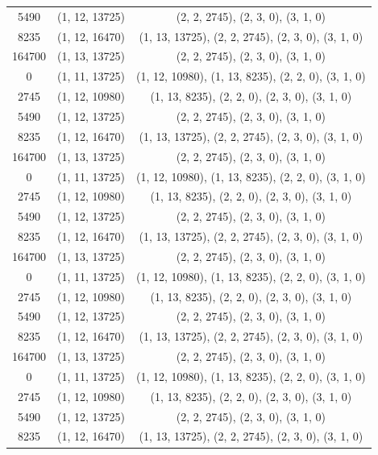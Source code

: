 \begin{small}
\begin{longtable}{ccc}
		5490   & (1, 12, 13725) & (2, 2, 2745), (2, 3, 0), (3, 1, 0) \\
		8235   & (1, 12, 16470) & (1, 13, 13725), (2, 2, 2745), (2, 3, 0), (3, 1, 0) \\
		164700 & (1, 13, 13725) & (2, 2, 2745), (2, 3, 0), (3, 1, 0) \\
		0      & (1, 11, 13725) & (1, 12, 10980), (1, 13, 8235), (2, 2, 0), (3, 1, 0) \\
		2745   & (1, 12, 10980) & (1, 13, 8235), (2, 2, 0), (2, 3, 0), (3, 1, 0) \\
		5490   & (1, 12, 13725) & (2, 2, 2745), (2, 3, 0), (3, 1, 0) \\
		8235   & (1, 12, 16470) & (1, 13, 13725), (2, 2, 2745), (2, 3, 0), (3, 1, 0) \\
		164700 & (1, 13, 13725) & (2, 2, 2745), (2, 3, 0), (3, 1, 0) \\
		0      & (1, 11, 13725) & (1, 12, 10980), (1, 13, 8235), (2, 2, 0), (3, 1, 0) \\
		2745   & (1, 12, 10980) & (1, 13, 8235), (2, 2, 0), (2, 3, 0), (3, 1, 0) \\
		5490   & (1, 12, 13725) & (2, 2, 2745), (2, 3, 0), (3, 1, 0) \\
		8235   & (1, 12, 16470) & (1, 13, 13725), (2, 2, 2745), (2, 3, 0), (3, 1, 0) \\
		164700 & (1, 13, 13725) & (2, 2, 2745), (2, 3, 0), (3, 1, 0) \\
		0      & (1, 11, 13725) & (1, 12, 10980), (1, 13, 8235), (2, 2, 0), (3, 1, 0) \\
		2745   & (1, 12, 10980) & (1, 13, 8235), (2, 2, 0), (2, 3, 0), (3, 1, 0) \\
		5490   & (1, 12, 13725) & (2, 2, 2745), (2, 3, 0), (3, 1, 0) \\
		8235   & (1, 12, 16470) & (1, 13, 13725), (2, 2, 2745), (2, 3, 0), (3, 1, 0) \\
		164700 & (1, 13, 13725) & (2, 2, 2745), (2, 3, 0), (3, 1, 0) \\
		0      & (1, 11, 13725) & (1, 12, 10980), (1, 13, 8235), (2, 2, 0), (3, 1, 0) \\
		2745   & (1, 12, 10980) & (1, 13, 8235), (2, 2, 0), (2, 3, 0), (3, 1, 0) \\
		5490   & (1, 12, 13725) & (2, 2, 2745), (2, 3, 0), (3, 1, 0) \\
		8235   & (1, 12, 16470) & (1, 13, 13725), (2, 2, 2745), (2, 3, 0), (3, 1, 0) \\

\end{longtable}
\end{small}

